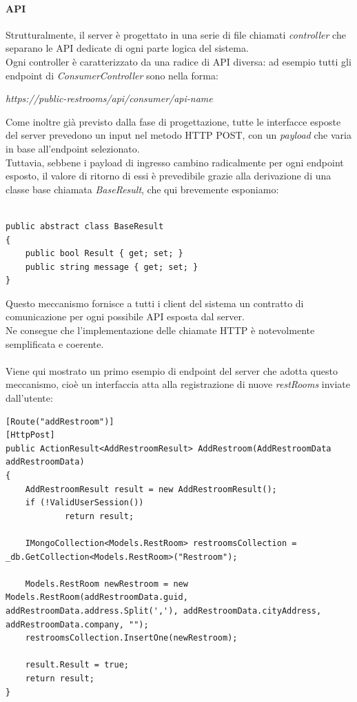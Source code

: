 \documentclass[12pt]{article}
\begin{document}
\paragraph{API}
Strutturalmente, il server è progettato in una serie di file chiamati \textit{controller} che separano le API dedicate di ogni parte logica del sistema.\\
Ogni controller è caratterizzato da una radice di API diversa: ad esempio tutti gli endpoint di \textit{ConsumerController} sono nella forma:
\begin{center}
\textit{https://public-restrooms/api/consumer/api-name}
\end{center}
Come inoltre già previsto dalla fase di progettazione, tutte le interfacce esposte del server prevedono un input nel metodo HTTP POST, con un \textit{payload} che varia in base all'endpoint selezionato.\\
Tuttavia, sebbene i payload di ingresso cambino radicalmente per ogni endpoint esposto, il valore di ritorno di essi è prevedibile grazie alla derivazione di una classe base chiamata \textit{BaseResult}, che qui brevemente esponiamo:
\begin{lstlisting}

public abstract class BaseResult
{
    public bool Result { get; set; }
    public string message { get; set; }
}
\end{lstlisting}
Questo meccanismo fornisce a tutti i client del sistema un contratto di comunicazione per ogni possibile API esposta dal server.\\ 
Ne consegue che l'implementazione delle chiamate HTTP è notevolmente semplificata e coerente.\\\\
Viene qui mostrato un primo esempio di endpoint del server che adotta questo meccanismo, cioè un interfaccia atta alla registrazione di nuove \textit{restRooms} inviate dall'utente:
\newpage
\begin{lstlisting}
[Route("addRestroom")]
[HttpPost]
public ActionResult<AddRestroomResult> AddRestroom(AddRestroomData addRestroomData)
{
    AddRestroomResult result = new AddRestroomResult();
    if (!ValidUserSession())
            return result;
        
    IMongoCollection<Models.RestRoom> restroomsCollection = _db.GetCollection<Models.RestRoom>("Restroom");
    
    Models.RestRoom newRestroom = new Models.RestRoom(addRestroomData.guid, addRestroomData.address.Split(','), addRestroomData.cityAddress, addRestroomData.company, "");
    restroomsCollection.InsertOne(newRestroom);

    result.Result = true;
    return result;    
}
\end{lstlisting}
\end{document}
